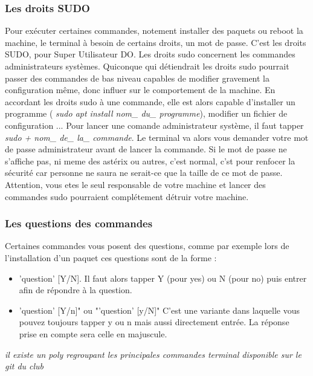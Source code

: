 \subsubsection{Les droits SUDO}
Pour exécuter certaines commandes, notement installer des paquets ou reboot la machine, le terminal à besoin de certains droits, un mot de passe.  C'est les droits SUDO, pour Super Utilisateur DO. 
Les droits sudo concernent les commandes administrateurs systèmes. Quiconque qui détiendrait les droits sudo pourrait passer des commandes de bas niveau capables de modifier gravement la configuration même, donc influer sur le comportement de la machine. En accordant les droits sudo à une commande, elle est alors capable d'installer un programme ( \textit{sudo apt install nom\_ du\_ programme}), modifier un fichier de configuration ... Pour lancer une comande administrateur système, il faut tapper \textit{sudo + nom\_ de\_ la\_ commande}. Le terminal va alors vous demander votre mot de passe administrateur avant de lancer la commande. Si le mot de passe ne s'affiche pas, ni meme des astérix ou autres, c'est normal, c'st pour renfocer la sécurité car personne ne saura ne serait-ce que la taille de ce mot de passe. Attention, vous etes le seul responsable de votre machine et lancer des commandes sudo pourraient complétement détruir votre machine.

\subsubsection{Les questions des commandes}
Certaines commandes vous posent des questions, comme par exemple lors de l'installation d'un paquet
ces questions sont de la forme :

\begin{itemize}
\item 'question' [Y/N]. Il faut alors tapper Y (pour yes) ou N (pour no) puis entrer afin de répondre à la question.
\item 'question' [Y/n]" ou "'question' [y/N]" C'est une variante dans laquelle vous pouvez toujours tapper y ou n mais aussi directement entrée. La réponse prise en compte sera celle en majuscule. 
\end{itemize}

\textit{il existe un poly regroupant les principales commandes terminal disponible sur le git du club}
